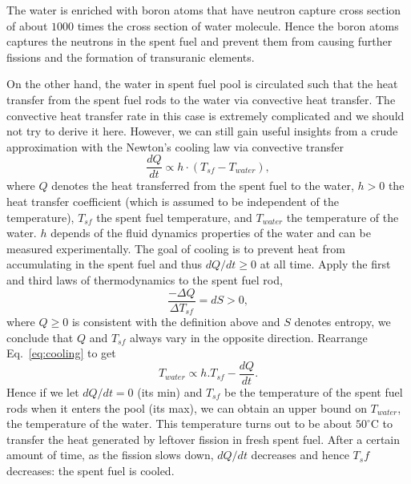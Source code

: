 \documentclass[nofootinbib,preprint,aps]{revtex4-1}
\begin{document}
    The water is enriched with boron atoms that have neutron capture cross section of about $1000$ times
    the cross section of water molecule. Hence the boron atoms captures the neutrons in the spent fuel
    and prevent them from causing further fissions and the formation of transuranic elements.

    On the other hand, the water in spent fuel pool is circulated such that the heat transfer from the spent
    fuel rods to the water via convective heat transfer. The convective heat transfer rate in this case is
    extremely complicated and we should not try to derive it here. However, we can still gain useful insights
    from a crude approximation with the Newton's cooling law via convective transfer
    \begin{equation}
        \label{eq:cooling}
        \frac{dQ}{dt} \propto h\cdot (T_{sf} - T_{water}),
    \end{equation}
    where $Q$ denotes the heat transferred from the spent fuel to the water,
    $h>0$ the heat transfer coefficient (which is assumed to be independent
    of the temperature), $T_{sf}$ the spent fuel temperature, and $T_{water}$ the temperature
    of the water.
    $h$ depends of the fluid dynamics properties of the water and can be measured experimentally. The goal of
    cooling is to prevent heat from accumulating in the spent fuel and thus $dQ/dt \geq 0$ at all time.
    Apply the first and third laws of thermodynamics to the spent fuel rod,
    \begin{equation}
        \label{eq:first}
        \frac{-\Delta Q}{\Delta T_{sf}} = dS > 0,
    \end{equation}
    where $Q\geq 0$ is consistent with the definition above and $S$ denotes entropy, we conclude that $Q$ and $T_{sf}$ always vary in the opposite direction. Rearrange Eq.~\ref{eq:cooling} to get
    \begin{equation}
        T_{water} \propto h.T_{sf} - \frac{dQ}{dt}.
    \end{equation}
    Hence if we let $dQ/dt=0$ (its min) and $T_{sf}$ be the temperature of the spent
    fuel rods when it enters the pool (its max), we
    can obtain an upper bound on $T_{water}$, the temperature of the water. This temperature turns out to
    be about $50^{\circ}$C to transfer the heat generated by leftover fission in fresh spent fuel. After a
    certain amount of time, as the fission slows down, $dQ/dt$ decreases and hence $T_sf$ decreases: the spent
    fuel is cooled.
\end{document}
